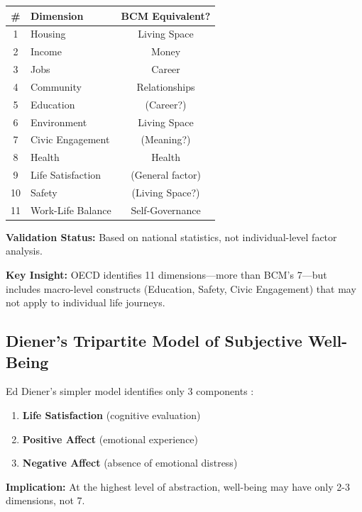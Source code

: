 \begin{center}
\small
\begin{tabular}{@{}clc@{}}
\toprule
\textbf{\#} & \textbf{Dimension} & \textbf{BCM Equivalent?} \\
\midrule
1 & Housing & Living Space \\
2 & Income & Money \\
3 & Jobs & Career \\
4 & Community & Relationships \\
5 & Education & (Career?) \\
6 & Environment & Living Space \\
7 & Civic Engagement & (Meaning?) \\
8 & Health & Health \\
9 & Life Satisfaction & (General factor) \\
10 & Safety & (Living Space?) \\
11 & Work-Life Balance & Self-Governance \\
\bottomrule
\end{tabular}
\end{center}

\textbf{Validation Status:} Based on national statistics, not individual-level factor analysis.

\textbf{Key Insight:} OECD identifies 11 dimensions---more than BCM's 7---but includes macro-level constructs (Education, Safety, Civic Engagement) that may not apply to individual life journeys.

\subsection{Diener's Tripartite Model of Subjective Well-Being}

Ed Diener's simpler model identifies only 3 components \citep{diener1984subjective}:

\begin{enumerate}[nosep]
\item \textbf{Life Satisfaction} (cognitive evaluation)
\item \textbf{Positive Affect} (emotional experience)
\item \textbf{Negative Affect} (absence of emotional distress)
\end{enumerate}

\textbf{Implication:} At the highest level of abstraction, well-being may have only 2-3 dimensions, not 7.


